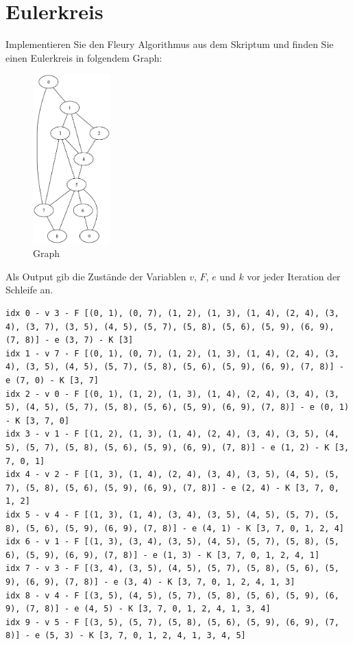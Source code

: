 \documentclass[a4paper,11pt]{report}
\begin{document}
\newpage

\chapter{Eulerkreis}

Implementieren Sie den Fleury Algorithmus aus dem Skriptum und finden Sie einen Eulerkreis in folgendem Graph:
\begin{figure}[htbp]
    \centering
    \includegraphics[width=3cm]{notebook/assets/aufgabe_07_graph.png}
    \caption{Graph}
    \label{fig:eulerkreis_graph}
\end{figure}

Als Output gib die Zustände der Variablen $v$, $F$, $e$ und $k$ vor jeder Iteration der Schleife an.

\begin{verbatim}
idx 0 - v 3 - F [(0, 1), (0, 7), (1, 2), (1, 3), (1, 4), (2, 4), (3, 4), (3, 7), (3, 5), (4, 5), (5, 7), (5, 8), (5, 6), (5, 9), (6, 9), (7, 8)] - e (3, 7) - K [3]
idx 1 - v 7 - F [(0, 1), (0, 7), (1, 2), (1, 3), (1, 4), (2, 4), (3, 4), (3, 5), (4, 5), (5, 7), (5, 8), (5, 6), (5, 9), (6, 9), (7, 8)] - e (7, 0) - K [3, 7]
idx 2 - v 0 - F [(0, 1), (1, 2), (1, 3), (1, 4), (2, 4), (3, 4), (3, 5), (4, 5), (5, 7), (5, 8), (5, 6), (5, 9), (6, 9), (7, 8)] - e (0, 1) - K [3, 7, 0]
idx 3 - v 1 - F [(1, 2), (1, 3), (1, 4), (2, 4), (3, 4), (3, 5), (4, 5), (5, 7), (5, 8), (5, 6), (5, 9), (6, 9), (7, 8)] - e (1, 2) - K [3, 7, 0, 1]
idx 4 - v 2 - F [(1, 3), (1, 4), (2, 4), (3, 4), (3, 5), (4, 5), (5, 7), (5, 8), (5, 6), (5, 9), (6, 9), (7, 8)] - e (2, 4) - K [3, 7, 0, 1, 2]
idx 5 - v 4 - F [(1, 3), (1, 4), (3, 4), (3, 5), (4, 5), (5, 7), (5, 8), (5, 6), (5, 9), (6, 9), (7, 8)] - e (4, 1) - K [3, 7, 0, 1, 2, 4]
idx 6 - v 1 - F [(1, 3), (3, 4), (3, 5), (4, 5), (5, 7), (5, 8), (5, 6), (5, 9), (6, 9), (7, 8)] - e (1, 3) - K [3, 7, 0, 1, 2, 4, 1]
idx 7 - v 3 - F [(3, 4), (3, 5), (4, 5), (5, 7), (5, 8), (5, 6), (5, 9), (6, 9), (7, 8)] - e (3, 4) - K [3, 7, 0, 1, 2, 4, 1, 3]
idx 8 - v 4 - F [(3, 5), (4, 5), (5, 7), (5, 8), (5, 6), (5, 9), (6, 9), (7, 8)] - e (4, 5) - K [3, 7, 0, 1, 2, 4, 1, 3, 4]
idx 9 - v 5 - F [(3, 5), (5, 7), (5, 8), (5, 6), (5, 9), (6, 9), (7, 8)] - e (5, 3) - K [3, 7, 0, 1, 2, 4, 1, 3, 4, 5]    
\end{verbatim}
\end{document}
